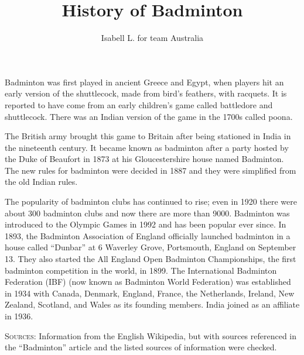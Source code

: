 \documentclass[a4paper]{article}
\begin{document}
\title{History of Badminton}
\author{Isabell L. for team Australia}
\maketitle

Badminton was first played in ancient Greece and Egypt, when players hit an early version of the shuttlecock, made from bird’s feathers, with racquets.  It is reported to have come from an early children's game called battledore and shuttlecock.  There was an Indian version of the game in the 1700s called poona.

The British army brought this game to Britain after being stationed in India in the nineteenth century.  It became known as badminton after a party hosted by the Duke of Beaufort in 1873 at his Gloucestershire house named Badminton.  The new rules for badminton were decided in 1887 and they were simplified from the old Indian rules.

The popularity of badminton clubs has continued to rise; even in 1920 there were about 300 badminton clubs and now there are more than 9000.  Badminton was introduced to the Olympic Games in 1992 and has been popular ever since.  In 1893, the Badminton Association of England officially launched badminton in a house called ``Dunbar'' at 6 Waverley Grove, Portsmouth, England on September 13.  They also started the All England Open Badminton Championships, the first badminton competition in the world, in 1899.  The International Badminton Federation (IBF) (now known as Badminton World Federation) was established in 1934 with Canada, Denmark, England, France, the Netherlands, Ireland, New Zealand, Scotland, and Wales as its founding members. India joined as an affiliate in 1936.

\textsc{Sources:} Information from the English Wikipedia, but with sources referenced in the ``Badminton'' article and the listed sources of information were checked.
\end{document}
